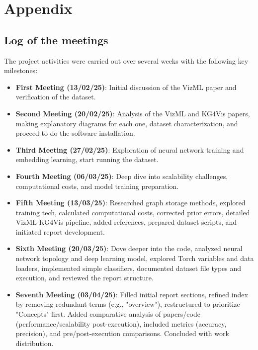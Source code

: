 \section{Appendix}

\subsection{Log of the meetings}

The project activities were carried out over several weeks with the following key milestones:

\begin{itemize}
\item \textbf{First Meeting (13/02/25)}: Initial discussion of the VizML paper and verification of the dataset.

\item \textbf{Second Meeting (20/02/25)}: Analysis of the VizML and KG4Vis papers, making explanatory diagrams for each one, dataset characterization, and proceed to do the software installation.

\item \textbf{Third Meeting (27/02/25)}: Exploration of neural network training and embedding learning, start running the dataset.

\item \textbf{Fourth Meeting (06/03/25)}: Deep dive into scalability challenges, computational costs, and model training preparation.

\item \textbf{Fifth Meeting (13/03/25)}: Researched graph storage methods, explored training tech, calculated computational costs, corrected prior errors, detailed VizML-KG4Vis pipeline, added references, prepared dataset scripts, and initiated report development.

\item \textbf{Sixth Meeting (20/03/25)}: Dove deeper into the code, analyzed neural network topology and deep learning model, explored Torch variables and data loaders, implemented simple classifiers, documented dataset file types and execution, and reviewed the report structure.

\item \textbf{Seventh Meeting (03/04/25)}: Filled initial report sections, refined index by removing redundant terms (e.g., "overview"), restructured to prioritize "Concepts" first. Added comparative analysis of papers/code (performance/scalability post-execution), included metrics (accuracy, precision), and pre/post-execution comparisons. Concluded with work distribution.


\end{itemize}
